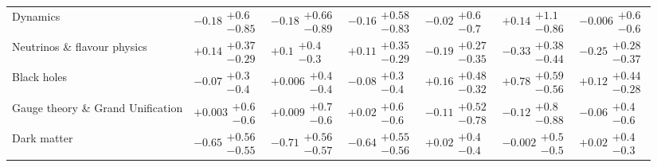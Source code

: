\begin{tabular}{lllllll}
Dynamics                                  &        $-0.18\substack{+0.6 \\ -0.85}$ &       $-0.18\substack{+0.66 \\ -0.89}$ &       $-0.16\substack{+0.58 \\ -0.83}$ &         $-0.02\substack{+0.6 \\ -0.7}$ &        $+0.14\substack{+1.1 \\ -0.86}$ &        $-0.006\substack{+0.6 \\ -0.6}$ \\
Neutrinos \& flavour physics              &       $+0.14\substack{+0.37 \\ -0.29}$ &          $+0.1\substack{+0.4 \\ -0.3}$ &       $+0.11\substack{+0.35 \\ -0.29}$ &       $-0.19\substack{+0.27 \\ -0.35}$ &       $-0.33\substack{+0.38 \\ -0.44}$ &       $-0.25\substack{+0.28 \\ -0.37}$ \\
Black holes                               &         $-0.07\substack{+0.3 \\ -0.4}$ &        $+0.006\substack{+0.4 \\ -0.4}$ &         $-0.08\substack{+0.3 \\ -0.4}$ &       $+0.16\substack{+0.48 \\ -0.32}$ &  $\bm{+0.78}\substack{+0.59 \\ -0.56}$ &       $+0.12\substack{+0.44 \\ -0.28}$ \\
Gauge theory \& Grand Unification         &        $+0.003\substack{+0.6 \\ -0.6}$ &        $+0.009\substack{+0.7 \\ -0.6}$ &         $+0.02\substack{+0.6 \\ -0.6}$ &       $-0.11\substack{+0.52 \\ -0.78}$ &        $-0.12\substack{+0.8 \\ -0.88}$ &         $-0.06\substack{+0.4 \\ -0.6}$ \\
Dark matter                               &  $\bm{-0.65}\substack{+0.56 \\ -0.55}$ &  $\bm{-0.71}\substack{+0.56 \\ -0.57}$ &  $\bm{-0.64}\substack{+0.55 \\ -0.56}$ &         $+0.02\substack{+0.4 \\ -0.4}$ &        $-0.002\substack{+0.5 \\ -0.5}$ &         $+0.02\substack{+0.4 \\ -0.3}$ \\

\end{tabular}
